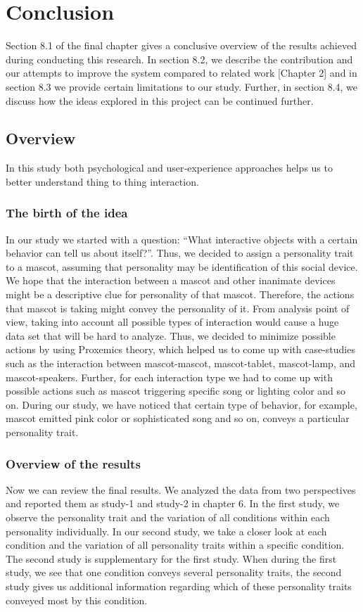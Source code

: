 \chapter{Conclusion}
\label{ch:conclusion}
Section 8.1 of the final chapter gives a conclusive overview of the results achieved during conducting this research.
In section 8.2, we describe the contribution and our attempts to improve the system compared to related
work [Chapter 2] and in section 8.3 we provide certain limitations to our study.
Further, in section 8.4, we discuss how the ideas explored in this project can be continued further.

\section{Overview}
\label{sec:overview}
In this study both psychological and user‐experience approaches helps us to better understand thing to thing interaction.

\subsection{The birth of the idea}
\label{subsec:the-birth-of-the-idea}
In our study we started with a question: “What interactive objects with a certain behavior can tell us about itself?”.
Thus, we decided to assign a personality trait to a mascot, assuming that personality
may be identification of this social device.
We hope that the interaction between a mascot and other inanimate devices might be a
descriptive clue for personality of that mascot.
Therefore, the actions that mascot is taking might convey the personality of it.
From analysis point of view, taking into account all possible types of interaction
would cause a huge data set that will be hard to analyze.
Thus, we decided to minimize
possible actions by using Proxemics theory, which helped us to come up with case-studies such
as the interaction between mascot-mascot, mascot-tablet, mascot-lamp, and mascot-speakers.
Further, for each interaction type we had to come up with possible actions such as mascot
triggering specific song or lighting color and so on.
During our study, we have noticed that
certain type of behavior, for example, mascot emitted pink color or
sophisticated song and so on, conveys a particular personality trait.

\subsection{Overview of the results}
\label{subsec:overview-of-the-results}
Now we can review the final results.
We analyzed the data from two perspectives and reported them as study-1 and study-2 in chapter 6.
In the first study, we observe the personality trait and the variation of all
conditions within each personality individually.
In our second study, we take a closer look at each condition and the variation of
all personality traits within a specific condition.
The second study is supplementary for the first study.
When during the first study, we see that one condition conveys several personality traits,
the second study gives us additional information regarding which of these personality
traits conveyed most by this condition.

